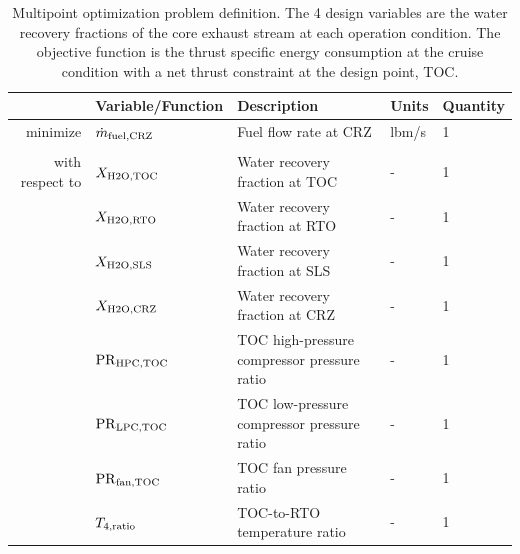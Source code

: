 \documentclass[conf]{new-aiaa}
\begin{document}
\begin{table}[hbt!]
    \centering
    \caption{
        Multipoint optimization problem definition.
        The 4 design variables are the water recovery fractions of the core exhaust stream at each operation condition.
        The objective function is the thrust specific energy consumption at the cruise condition with a net thrust constraint at the design point, TOC.
    }
    \small
    \renewcommand{\arraystretch}{1.2}
    \begin{tabular}{r l l l l}
        \toprule
                        & Variable/Function              & Description                                 & Units            & Quantity \\
        \hline
        minimize        & $ \dot{m}_{\rm{fuel,CRZ}} $    & Fuel flow rate at CRZ                       & \unit{lbm/s}     & 1        \\
                        &                                &                                             &                  &          \\
        with respect to & $X_{\rm{H2O,TOC}}$             & Water recovery fraction at TOC              & -                & 1        \\
                        & $X_{\rm{H2O,RTO}}$             & Water recovery fraction at RTO              & -                & 1        \\
                        & $X_{\rm{H2O,SLS}}$             & Water recovery fraction at SLS              & -                & 1        \\
                        & $X_{\rm{H2O,CRZ}}$             & Water recovery fraction at CRZ              & -                & 1        \\
                        & $\rm{PR}_{\rm{HPC,TOC}}$       & TOC high-pressure compressor pressure ratio & -                & 1        \\
                        & $\rm{PR}_{\rm{LPC,TOC}}$       & TOC low-pressure compressor pressure ratio  & -                & 1        \\
                        & $\rm{PR}_{\rm{fan,TOC}}$       & TOC fan pressure ratio                      & -                & 1        \\
                        & $T_{4,\rm{ratio}}$             & TOC-to-RTO temperature ratio                & -                & 1        \\

\end{tabular}
\end{table}
\end{document}
